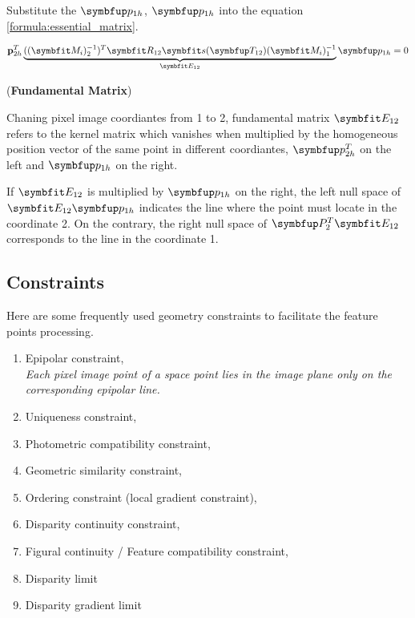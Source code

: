 Substitute the $\Vect{p}_{1h}$, $\Vect{p}_{1h}$ into the equation \ref{formula:essential_matrix}.

\begin{equation}\label{formula:fundamental_matrix}
\mathbf{p}_{2h}^{T} \underbrace{ ((\Matr{M}_{i})_2^{-1})^T \Matr{R}_{12} \Matr{s}(\Vect{T}_{12}) (\Matr{M}_{i})_1^{-1}}_{\Matr{E}_{12}} \Vect{p}_{1h}=0
\end{equation}

\begin{definition}
	(\textbf{Fundamental Matrix})
	
	Chaning pixel image coordiantes from 1 to 2, fundamental matrix $\Matr{E}_{12}$ refers to the kernel matrix which vanishes when multiplied by the homogeneous position vector of the same point in different coordiantes, $\Vect{p}_{2h}^T$ on the left and $\Vect{p}_{1h}$ on the right.
	
	If $\Matr{E}_{12}$ is multiplied by $\Vect{p}_{1h}$ on the right, the left null space of $\Matr{E}_{12}\Vect{p}_{1h}$ indicates the line where the point must locate in the coordinate 2. On the contrary, the right null space of $\Vect{P}_2^T \Matr{E}_{12}$ corresponds to the line in the coordinate 1.
	\end{definition}

\subsection{Constraints}
Here are some frequently used geometry constraints to facilitate the feature points processing.
\begin{enumerate}
	\item Epipolar constraint,\\
	\textit{Each pixel image point of a space point lies in the image plane only on the corresponding epipolar line.}
	\item Uniqueness constraint,
	\item Photometric compatibility constraint,
	\item Geometric similarity constraint,
	\item Ordering constraint (local gradient constraint),
	\item Disparity continuity constraint,
	\item Figural continuity / Feature compatibility constraint,
	\item Disparity limit
	\item Disparity gradient limit
\end{enumerate}